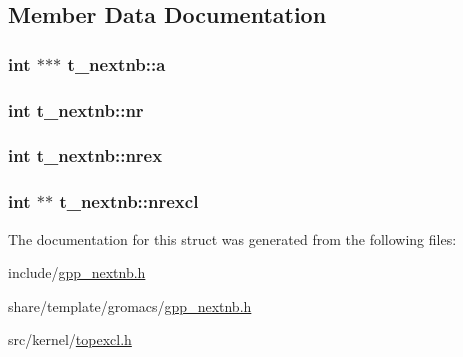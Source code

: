 \subsection{\-Member \-Data \-Documentation}
\hypertarget{structt__nextnb_a83013825caa1fe8ba2e7d7c8fe3fae6d}{
\subsubsection[{a}]{\setlength{\rightskip}{0pt plus 5cm}int $\ast$$\ast$$\ast$ {\bf t\-\_\-nextnb\-::a}}}\label{structt__nextnb_a83013825caa1fe8ba2e7d7c8fe3fae6d}
\hypertarget{structt__nextnb_af842fa22a6f80aec83ac2ec48a335fd4}{
\subsubsection[{nr}]{\setlength{\rightskip}{0pt plus 5cm}int {\bf t\-\_\-nextnb\-::nr}}}\label{structt__nextnb_af842fa22a6f80aec83ac2ec48a335fd4}
\hypertarget{structt__nextnb_a4d151db0282d6bf1ce3248136318fad4}{
\subsubsection[{nrex}]{\setlength{\rightskip}{0pt plus 5cm}int {\bf t\-\_\-nextnb\-::nrex}}}\label{structt__nextnb_a4d151db0282d6bf1ce3248136318fad4}
\hypertarget{structt__nextnb_a659ce982f3339bfe925b8f2afc357f58}{
\subsubsection[{nrexcl}]{\setlength{\rightskip}{0pt plus 5cm}int $\ast$$\ast$ {\bf t\-\_\-nextnb\-::nrexcl}}}\label{structt__nextnb_a659ce982f3339bfe925b8f2afc357f58}


\-The documentation for this struct was generated from the following files\-:\begin{DoxyCompactItemize}
\item 
include/\hyperlink{include_2gpp__nextnb_8h}{gpp\-\_\-nextnb.\-h}\item 
share/template/gromacs/\hyperlink{share_2template_2gromacs_2gpp__nextnb_8h}{gpp\-\_\-nextnb.\-h}\item 
src/kernel/\hyperlink{topexcl_8h}{topexcl.\-h}\end{DoxyCompactItemize}
